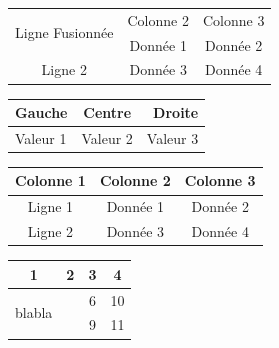 \documentclass[a4paper,12pt]{article} %
\begin{document}
\vspace{1cm} %

\begin{tabular}{|c|c|c|}
\hline
\multirow{2}{*}{Ligne Fusionnée} & Colonne 2 & Colonne 3 \\ %
\cline{2-3} %
                                  & Donnée 1  & Donnée 2 \\
\hline
Ligne 2 & Donnée 3 & Donnée 4 \\
\hline
\end{tabular}

\vspace{1cm} %

\begin{tabular}{|l|c|r|}
\hline
Gauche & Centre & Droite \\ %
\hline
Valeur 1 & Valeur 2 & Valeur 3 \\ %
\hline
\end{tabular}

\vspace{1cm} %

\begin{tabular}{|c|c|c|}
\hline
Colonne 1 & Colonne 2 & Colonne 3 \\
\hline
Ligne 1 & Donnée 1 & Donnée 2 \\
\cline{1-2} %
Ligne 2 & Donnée 3 & Donnée 4 \\
\hline
\end{tabular}
\vspace{1cm} %

\begin{tabular}{|c|c|c|c|}
\hline
1 & 2 & 3 & 4 \\ %
\hline
\multirow{2}{*}{blabla} &   & 6 & 10 \\ %
\cline{3-4} %
                    &   & 9 & 11 \\ %
\hline
\end{tabular}
\end{document}
